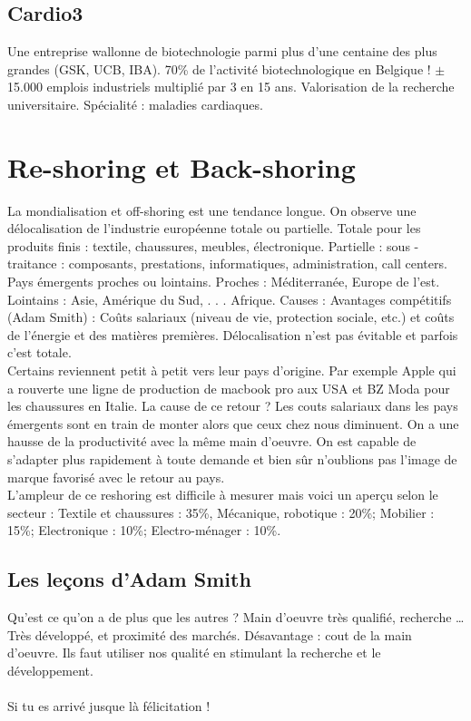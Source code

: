 \subsection{Cardio3}
Une entreprise wallonne de biotechnologie parmi plus d’une centaine des plus grandes (GSK, UCB, IBA). 70\% de l'activité biotechnologique en Belgique ! $\pm$ 15.000 emplois industriels multiplié par 3 en 15 ans. Valorisation de la recherche universitaire. Spécialité : maladies cardiaques.

\section{Re-shoring et Back-shoring}
La mondialisation et off-shoring est une tendance longue. On observe une
délocalisation de l’industrie européenne totale ou partielle. Totale pour les
produits finis : textile, chaussures, meubles, électronique. Partielle : sous
-traitance : composants, prestations, informatiques, administration, call
centers. Pays émergents proches ou lointains. Proches : Méditerranée,
Europe de l’est. Lointains : Asie, Amérique du Sud, . . . Afrique. Causes :
Avantages compétitifs (Adam Smith) : Coûts salariaux (niveau de vie, 
protection sociale, etc.) et coûts de l’énergie et des matières premières.
Délocalisation n'est pas évitable et parfois c'est totale. \\
Certains reviennent petit à petit vers leur pays d'origine. Par exemple Apple qui a rouverte une ligne de production de macbook pro aux USA et BZ Moda pour les chaussures en Italie. La cause de ce retour ? Les couts salariaux dans les pays émergents sont en train de monter alors que ceux chez nous diminuent. On a une hausse de la productivité avec la même main d’oeuvre. On est capable de s'adapter plus rapidement à toute demande et bien sûr n'oublions pas l'image de marque favorisé avec le retour au pays. \\
L'ampleur de ce reshoring est difficile à mesurer mais voici un aperçu selon
le secteur : Textile et chaussures : 35\%, Mécanique, robotique : 20\%;
Mobilier : 15\%; Electronique : 10\%; Electro-ménager : 10\%.

\subsection{Les leçons d'Adam Smith}
Qu’est ce qu’on a de plus que les autres ? Main d’oeuvre très qualifié, recherche … Très développé, et proximité des marchés. Désavantage : cout de la main d’oeuvre. Ils faut utiliser nos qualité en stimulant la recherche et le développement.\\
\\
Si tu es arrivé jusque là félicitation !
